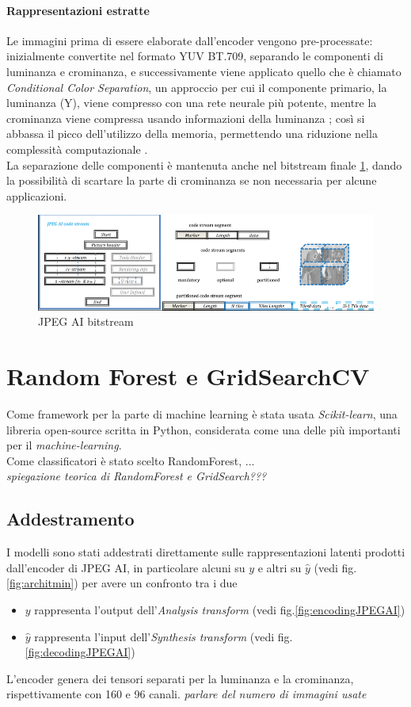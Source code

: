 \paragraph{Rappresentazioni estratte} Le immagini prima di essere elaborate dall'encoder vengono pre-processate: inizialmente convertite nel formato YUV BT.709, separando le componenti di luminanza e crominanza, e successivamente viene applicato quello che è chiamato \textit{Conditional Color Separation}, un approccio per cui il componente primario, la luminanza (Y), viene compresso con una rete neurale più potente, mentre la crominanza viene compressa usando informazioni della luminanza \cite{ccs}; così si abbassa il picco dell'utilizzo della memoria, permettendo una riduzione nella complessità computazionale .\\
La separazione delle componenti è mantenuta anche nel bitstream finale \ref{fig:bitstream}, dando la possibilità di scartare la parte di crominanza se non necessaria per alcune applicazioni.
\begin{figure}
    \centering
    \includegraphics[width=1\linewidth]{img/JPEG AI codestream.png}
    \caption{JPEG AI bitstream}
    \label{fig:bitstream}
\end{figure}
\section{Random Forest e GridSearchCV}
Come framework per la parte di machine learning è stata usata \textit{Scikit-learn}, una libreria open-source scritta in Python, considerata come una delle più importanti per il \textit{machine-learning}.\\
Come classificatori è stato scelto RandomForest, ...\\ \textit{spiegazione teorica di RandomForest e GridSearch???}
\subsection{Addestramento}
I modelli sono stati addestrati direttamente sulle rappresentazioni latenti prodotti dall'encoder di JPEG AI, in particolare alcuni su $y$ e altri su $\hat{y}$ (vedi fig. \ref{fig:architmin}) per avere un confronto tra i due
\begin{itemize}
    \item $y$ rappresenta l'output dell'\textit{Analysis transform} (vedi fig.\ref{fig:encodingJPEGAI})
    \item $\hat{y}$ rappresenta l'input dell'\textit{Synthesis transform} (vedi fig. \ref{fig:decodingJPEGAI})
\end{itemize}
L'encoder genera dei tensori separati per la luminanza e la crominanza, rispettivamente con 160 e 96 canali.
\textit{parlare del numero di immagini usate}
